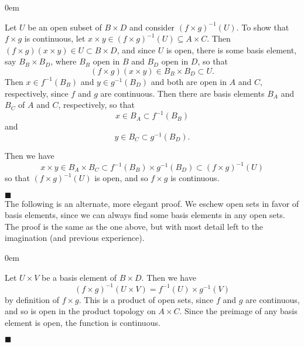 \documentclass[12pt]{article}
\renewcommand{\qed}{\hfill$\blacksquare$}
\renewenvironment{proof}{\begin{addmargin}[1em]{0em}\begin{newproof}}{\end{newproof}\end{addmargin}\qed}
\begin{document}
\begin{proof}
	Let $U$ be an open subset of $B\times D$ and consider $\left(f\times g\right)^{-1}\left(U\right)$. To show that $f\times g$ is continuous, let $x \times y \in \left(f\times g\right)^{-1}\left(U\right) \subseteq A\times C$. Then $\left(f\times g\right)\left(x\times y\right) \in U\subset B\times D$, and since $U$ is open, there is some basis element, say $B_B \times B_D$, where $B_B$ open in $B$ and $B_D$ open in $D$, so that $$ \left(f\times g\right)\left(x\times y\right) \in B_B \times B_D \subset U.$$ Then $x \in f^{-1}\left(B_B\right)$ and $y \in g^{-1}\left(B_D\right)$ and both are open in $A$ and $C$, respectively, since $f$ and $g$ are continuous. Then there are basis elements $B_A$ and $B_C$ of $A$ and $C$, respectively, so that $$ x \in B_A \subset f^{-1}\left(B_B\right)$$ and $$ y \in B_C \subset g^{-1}\left(B_D\right). $$
	
	
	Then we have $$ x\times y \in B_A \times B_C \subset f^{-1}\left(B_B\right) \times g^{-1}\left(B_D\right) \subset \left(f\times g\right)^{-1}\left(U\right) $$ so that $\left(f\times g\right)^{-1}\left(U\right)$ is open, and so $f\times g$ is continuous.
\end{proof}\\

{\color{red}The following is an alternate, more elegant proof. We eschew open sets in favor of basis elements, since we can always find some basis elements in any open sets. The proof is the same as the one above, but with most detail left to the imagination (and previous experience).}\\

\begin{proof}
Let $U\times V$ be a basis element of $B\times D$. Then we have $$ \left(f\times g\right)^{-1}\left(U\times V\right) = f^{-1}\left(U\right)\times g^{-1}\left(V\right)$$ by definition of $f\times g$. This is a product of open sets, since $f$ and $g$ are continuous, and so is open in the product topology on $A\times C$. Since the preimage of any basis element is open, the function is continuous.
\end{proof}
\end{document}
